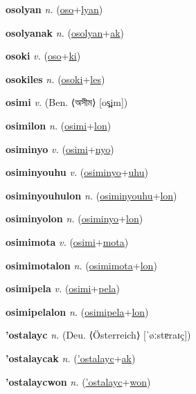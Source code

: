 \textbf{\hypertarget{osolyan}{osolyan}} \textit{n.} (\hyperlink{oso}{oso}+\allowbreak \hyperlink{lyan}{lyan})


\textbf{\hypertarget{osolyanak}{osolyanak}} \textit{n.} (\hyperlink{osolyan}{osolyan}+\allowbreak \hyperlink{ak}{ak})


\textbf{\hypertarget{osoki}{osoki}} \textit{v.} (\hyperlink{oso}{oso}+\allowbreak \hyperlink{ki}{ki})


\textbf{\hypertarget{osokiles}{osokiles}} \textit{n.} (\hyperlink{osoki}{osoki}+\allowbreak \hyperlink{les}{les})


\textbf{\hypertarget{osimi}{osimi}} \textit{v.} (Ben. ⟨{\bengali{}অসীম}⟩ [os̪im])


\textbf{\hypertarget{osimilon}{osimilon}} \textit{n.} (\hyperlink{osimi}{osimi}+\allowbreak \hyperlink{lon}{lon})


\textbf{\hypertarget{osiminyo}{osiminyo}} \textit{v.} (\hyperlink{osimi}{osimi}+\allowbreak \hyperlink{nyo}{nyo})


\textbf{\hypertarget{osiminyouhu}{osiminyouhu}} \textit{v.} (\hyperlink{osiminyo}{osiminyo}+\allowbreak \hyperlink{uhu}{uhu})


\textbf{\hypertarget{osiminyouhulon}{osiminyouhulon}} \textit{n.} (\hyperlink{osiminyouhu}{osiminyouhu}+\allowbreak \hyperlink{lon}{lon})


\textbf{\hypertarget{osiminyolon}{osiminyolon}} \textit{n.} (\hyperlink{osiminyo}{osiminyo}+\allowbreak \hyperlink{lon}{lon})


\textbf{\hypertarget{osimimota}{osimimota}} \textit{v.} (\hyperlink{osimi}{osimi}+\allowbreak \hyperlink{mota}{mota})


\textbf{\hypertarget{osimimotalon}{osimimotalon}} \textit{n.} (\hyperlink{osimimota}{osimimota}+\allowbreak \hyperlink{lon}{lon})


\textbf{\hypertarget{osimipela}{osimipela}} \textit{v.} (\hyperlink{osimi}{osimi}+\allowbreak \hyperlink{pela}{pela})


\textbf{\hypertarget{osimipelalon}{osimipelalon}} \textit{n.} (\hyperlink{osimipela}{osimipela}+\allowbreak \hyperlink{lon}{lon})


\textbf{\hypertarget{'ostalayc}{'ostalayc}} \textit{n.} (Deu. ⟨Österreich⟩ [ˈøːstɐraɪç])


\textbf{\hypertarget{'ostalaycak}{'ostalaycak}} \textit{n.} (\hyperlink{'ostalayc}{'ostalayc}+\allowbreak \hyperlink{ak}{ak})


\textbf{\hypertarget{'ostalaycwon}{'ostalaycwon}} \textit{n.} (\hyperlink{'ostalayc}{'ostalayc}+\allowbreak \hyperlink{won}{won})


